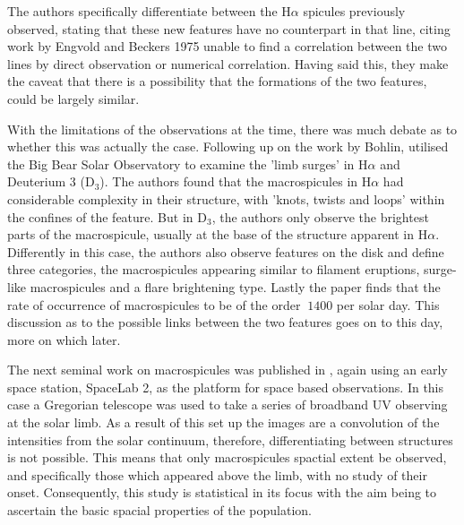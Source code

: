 
The authors specifically differentiate between the H$\alpha$ spicules previously observed, stating that these new features have no counterpart in that line, citing work by Engvold and Beckers 1975 unable to find a correlation between the two lines by direct observation or numerical correlation.
Having said this, they make the caveat that there is a possibility that the formations of the two features, could be largely similar.

With the limitations of the observations at the time, there was much debate as to whether this was actually the case. 
Following up on the work by Bohlin, \cite{LaBonte79} utilised the Big Bear Solar Observatory to examine the 'limb surges' in H$\alpha$ and Deuterium 3 (D$_3$).
The authors found that the macrospicules in H$\alpha$ had considerable complexity in their structure, with 'knots, twists and loops' within the confines of the feature.
But in D$_3$, the authors only observe the brightest parts of the macrospicule, usually at the base of the structure apparent in H$\alpha$.
Differently in this case, the authors also observe features on the disk and define three categories, the macrospicules appearing similar to filament eruptions, surge-like macrospicules and a flare brightening type.
Lastly the paper finds that the rate of occurrence of macrospicules to be of the order $~1400$ per solar day. 
This discussion as to the possible links between the two features goes on to this day, more on which later.

The next seminal work on macrospicules was published in \cite{Dere89}, again using an early space station, SpaceLab 2, as the platform for space based observations.
In this case a Gregorian telescope was used to take a series of broadband UV observing at the solar limb.
As a result of this set up the images are a convolution of the intensities from the solar continuum, therefore, differentiating between structures is not possible.
This means that only macrospicules spactial extent be observed, and specifically those which appeared above the limb, with no study of their onset.
Consequently, this study is statistical in its focus with the aim being to ascertain the basic spacial properties of the population.

